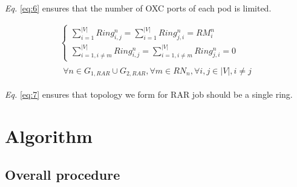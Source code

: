 \documentclass[conference]{IEEEtran}
\begin{document}
\emph{Eq.} \eqref{eq:6} ensures that the number of OXC ports of each pod is limited.

\begin{equation}\label{eq:7}
	\begin{split}
		\begin{cases}
			\sum_{i=1}^{|V|}Ring_{i,j}^n = \sum_{i=1}^{|V|}Ring_{j,i}^n = RM_i^n\\
			\sum_{i=1,i\neq m}^{|V|}Ring_{i,j}^n = \sum_{i=1,i\neq m}^{|V|}Ring_{j,i}^n = 0
		\end{cases}\\
		\begin{aligned}
			\forall n\in G_{1,RAR}\cup G_{2,RAR}, \forall m\in RN_n, \forall i,j\in |V|,i\neq j
		\end{aligned}
	\end{split}
\end{equation}

\emph{Eq.} \ref{eq:7} ensures that topology we form for RAR job should be a single ring.

\section{Algorithm}
\subsection{Overall procedure}

\end{document}
